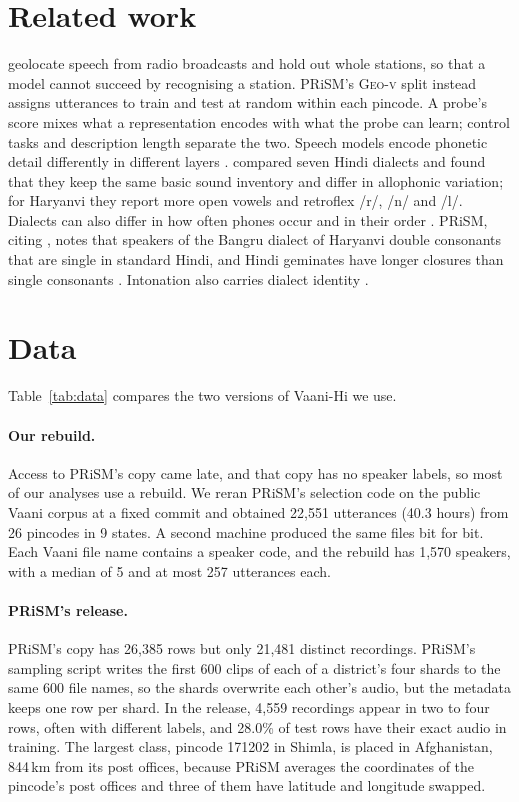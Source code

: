 \documentclass[11pt]{article}
\newcommand{\geov}{\textsc{Geo-v}}
\begin{document}
\section{Related work}
\citet{foley2024where} geolocate speech from radio broadcasts and hold out whole stations, so that a model
cannot succeed by recognising a station. PRiSM's \geov{} split instead assigns utterances to train and test at
random within each pincode. A probe's score mixes what a representation encodes with what the probe can learn;
control tasks \citep{hewitt2019control} and description length \citep{voita2020mdl} separate the two. Speech
models encode phonetic detail differently in different layers \citep{pasad2021layerwise,wells2022phonetic}.
\citet{mishra2011dialects} compared seven Hindi dialects and found that they keep the
same basic sound inventory and differ in allophonic variation; for Haryanvi they report more open vowels and
retroflex /r/, /n/ and /l/. Dialects can also differ in how often phones occur and in their order
\citep{shim2024phonotactic}. PRiSM, citing \citet{devi2021haryanvi}, notes that speakers of the Bangru dialect of
Haryanvi double consonants that are single in standard Hindi, and Hindi geminates have longer closures than single
consonants \citep{ohala2007geminates}. Intonation also carries dialect identity
\citep{grabe2002intonational,vicenik2013intonation}.

\section{Data}
\label{sec:data}
Table~\ref{tab:data} compares the two versions of Vaani-Hi we use.

\paragraph{Our rebuild.} Access to PRiSM's copy came late, and that copy has no speaker labels, so most of our
analyses use a rebuild. We reran PRiSM's selection code on the public Vaani corpus at a fixed commit and
obtained 22,551 utterances (40.3 hours) from 26 pincodes in 9 states. A second machine produced the same files
bit for bit. Each Vaani file name contains a speaker code, and the rebuild has 1,570 speakers, with a median of 5 and at
most 257 utterances each.

\paragraph{PRiSM's release.} PRiSM's copy has 26,385 rows but only 21,481 distinct recordings. PRiSM's sampling
script writes the first 600 clips of each of a district's four shards to the same 600 file names, so the shards
overwrite each other's audio, but the metadata keeps one row per shard. In the release, 4,559 recordings appear in
two to four rows, often with different labels, and 28.0\% of test rows have their exact audio in training. The
largest class, pincode 171202 in Shimla, is placed in Afghanistan, 844\,km from its post offices, because PRiSM
averages the coordinates of the pincode's post offices and three of them have latitude and longitude swapped.
\end{document}
